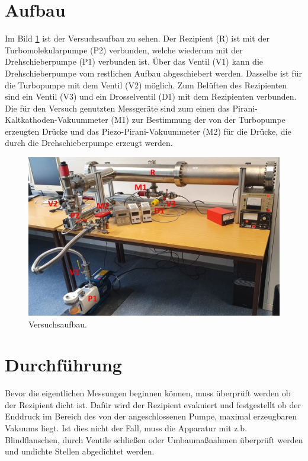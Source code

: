 \section{Aufbau}
\label{sec:Aufbau}
Im Bild \ref{fig:Versuchsaufbau} ist der Versuchsaufbau zu sehen. Der Rezipient (R) ist mit der Turbomolekularpumpe (P2) verbunden, 
welche wiederum mit der Drehschieberpumpe (P1) verbunden ist. Über das Ventil (V1) kann die Drehschieberpumpe vom 
restlichen Aufbau abgeschiebert werden. Dasselbe ist für die Turbopumpe mit dem Ventil (V2) möglich.
Zum Belüften des Rezipienten sind ein Ventil (V3) und ein Drosselventil (D1) mit dem Rezipienten verbunden.
Die für den Versuch genutzten Messgeräte sind zum einen das Pirani-Kaltkathoden-Vakuummeter (M1) zur Bestimmung der 
von der Turbopumpe erzeugten Drücke und das Piezo-Pirani-Vakuummeter (M2) für die Drücke, die durch die Drehschieberpumpe 
erzeugt werden.

    \begin{figure}
        \centering
        \includegraphics[width=1\textwidth]{Versuchsaufbau_V70.jpeg}
        \caption{Versuchsaufbau.}
        \label{fig:Versuchsaufbau}
    \end{figure}


\section{Durchführung}
\label{sec:Durchführung}
Bevor die eigentlichen Messungen beginnen können, muss überprüft werden ob der Rezipient dicht ist.
Dafür wird der Rezipient evakuiert und festgestellt ob der Enddruck im Bereich des von der angeschlossenen Pumpe, maximal erzeugbaren Vakuums liegt. 
Ist dies nicht der Fall, muss die Apparatur mit z.b. Blindflanschen, durch Ventile schließen oder Umbaumaßnahmen überprüft werden und undichte Stellen abgedichtet werden.

